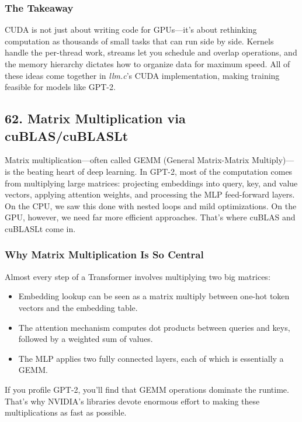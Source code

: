 \documentclass[
  letterpaper,
  DIV=11,
  numbers=noendperiod]{scrreprt}
\providecommand{\tightlist}{%
  \setlength{\itemsep}{0pt}\setlength{\parskip}{0pt}}
\begin{document}
\subsubsection{The Takeaway}\label{the-takeaway-50}

CUDA is not just about writing code for GPUs---it's about rethinking
computation as thousands of small tasks that can run side by side.
Kernels handle the per-thread work, streams let you schedule and overlap
operations, and the memory hierarchy dictates how to organize data for
maximum speed. All of these ideas come together in \emph{llm.c}'s CUDA
implementation, making training feasible for models like GPT-2.

\subsection{62. Matrix Multiplication via
cuBLAS/cuBLASLt}\label{matrix-multiplication-via-cublascublaslt}

Matrix multiplication---often called GEMM (General Matrix-Matrix
Multiply)---is the beating heart of deep learning. In GPT-2, most of the
computation comes from multiplying large matrices: projecting embeddings
into query, key, and value vectors, applying attention weights, and
processing the MLP feed-forward layers. On the CPU, we saw this done
with nested loops and mild optimizations. On the GPU, however, we need
far more efficient approaches. That's where cuBLAS and cuBLASLt come in.

\subsubsection{Why Matrix Multiplication Is So
Central}\label{why-matrix-multiplication-is-so-central}

Almost every step of a Transformer involves multiplying two big
matrices:

\begin{itemize}
\tightlist
\item
  Embedding lookup can be seen as a matrix multiply between one-hot
  token vectors and the embedding table.
\item
  The attention mechanism computes dot products between queries and
  keys, followed by a weighted sum of values.
\item
  The MLP applies two fully connected layers, each of which is
  essentially a GEMM.
\end{itemize}

If you profile GPT-2, you'll find that GEMM operations dominate the
runtime. That's why NVIDIA's libraries devote enormous effort to making
these multiplications as fast as possible.
\end{document}
